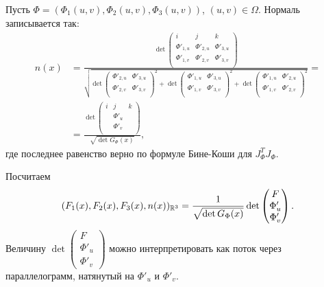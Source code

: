 \begin{remrk}
 Пусть $\Phi = (\Phi_1(u,v), \Phi_2(u,v), \Phi_3(u,v))$, $(u, v) \in \Omega$. Нормаль записывается так:
 \begin{align*}
  n(x) &= \frac{\det \begin{pmatrix}
    i & j & k \\
    \Phi'_{1,u} & \Phi'_{2,u} & \Phi'_{3,u} \\
    \Phi'_{1,v} & \Phi'_{2,v} & \Phi'_{3,v} \\
  \end{pmatrix} }{\sqrt{ \det \begin{pmatrix}
   \Phi'_{2,u} & \Phi'_{3,u} \\
   \Phi'_{2,v} & \Phi'_{3,v} \\
  \end{pmatrix}^{2} + \det \begin{pmatrix}
  \Phi'_{1,u} & \Phi'_{3,u} \\
  \Phi'_{1,v} & \Phi'_{3,v} \\
  \end{pmatrix}^{2} + \det \begin{pmatrix}
  \Phi'_{1,u} & \Phi'_{2,u} \\
  \Phi'_{1,v} & \Phi'_{2,v} \\
  \end{pmatrix}^2 }} = \\
  &=  \frac{\det \begin{pmatrix}
    i & j & k \\
    & \Phi'_u & \\
    & \Phi'_v & \\
  \end{pmatrix}}{\sqrt{\det G_{\Phi}(x)}}
 ,\end{align*} где последнее равенство верно по формуле Бине-Коши для $J_{\Phi}^{T} J_{\Phi}$.

 Посчитаем 
\begin{align*}
(F_1(x), F_2(x), F_3(x), n(x))_{\mathbb{R}^{3}} = \frac{1}{\sqrt{\det G_{\Phi}(x)}} \det \begin{pmatrix}
   F \\
   \Phi'_u \\
   \Phi'_v \\
  \end{pmatrix}
 .\end{align*} Величину $\det \begin{pmatrix}
  F \\
  \Phi'_u \\
  \Phi'_v
 \end{pmatrix}$ можно интерпретировать как поток через параллелограмм, натянутый на $\Phi'_u$ и $\Phi'_v$.
\end{remrk}

